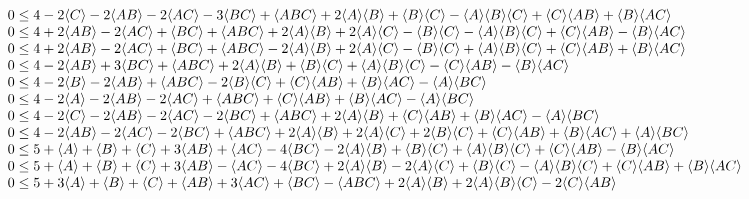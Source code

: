 \begin{align*}
\begin{array}{l}
 0
\leq
{4 -2 \expec{C} -2 \expec{A B} -2 \expec{A C} -3 \expec{B C} + \expec{A B C} + 2 \expec{A} \expec{B} + \expec{B} \expec{C} -\expec{A} \expec{B} \expec{C} + \expec{C} \expec{A B} + \expec{B} \expec{A C}} \\
 0
\leq
{4 + 2 \expec{A B} -2 \expec{A C} + \expec{B C} + \expec{A B C} + 2 \expec{A} \expec{B} + 2 \expec{A} \expec{C} -\expec{B} \expec{C} -\expec{A} \expec{B} \expec{C} + \expec{C} \expec{A B} -\expec{B} \expec{A
   C}} \\
 0
\leq
{4 + 2 \expec{A B} -2 \expec{A C} + \expec{B C} + \expec{A B C} -2 \expec{A} \expec{B} + 2 \expec{A} \expec{C} -\expec{B} \expec{C} + \expec{A} \expec{B} \expec{C} + \expec{C} \expec{A B} + \expec{B} \expec{A C}}
   \\
 0
\leq
{4 -2 \expec{A B} + 3 \expec{B C} + \expec{A B C} + 2 \expec{A} \expec{B} + \expec{B} \expec{C} + \expec{A} \expec{B} \expec{C} -\expec{C} \expec{A B} -\expec{B} \expec{A C}} \\
 0
\leq
{4 -2 \expec{B} -2 \expec{A B} + \expec{A B C} -2 \expec{B} \expec{C} + \expec{C} \expec{A B} + \expec{B} \expec{A C} -\expec{A} \expec{B C}} \\
 0
\leq
{4 -2 \expec{A} -2 \expec{A B} -2 \expec{A C} + \expec{A B C} + \expec{C} \expec{A B} + \expec{B} \expec{A C} -\expec{A} \expec{B C}} \\
 0
\leq
{4 -2 \expec{C} -2 \expec{A B} -2 \expec{A C} -2 \expec{B C} + \expec{A B C} + 2 \expec{A} \expec{B} + \expec{C} \expec{A B} + \expec{B} \expec{A C} -\expec{A} \expec{B C}} \\
 0
\leq
{4 -2 \expec{A B} -2 \expec{A C} -2 \expec{B C} + \expec{A B C} + 2 \expec{A} \expec{B} + 2 \expec{A} \expec{C} + 2 \expec{B} \expec{C} + \expec{C} \expec{A B} + \expec{B} \expec{A C} + \expec{A} \expec{B C}} \\
 0
\leq
{5 + \expec{A} + \expec{B} + \expec{C} + 3 \expec{A B} + \expec{A C} -4 \expec{B C} -2 \expec{A} \expec{B} + \expec{B} \expec{C} + \expec{A} \expec{B} \expec{C} + \expec{C} \expec{A B} -\expec{B} \expec{A C}} \\
 0
\leq
{5 + \expec{A} + \expec{B} + \expec{C} + 3 \expec{A B} -\expec{A C} -4 \expec{B C} + 2 \expec{A} \expec{B} -2 \expec{A} \expec{C} + \expec{B} \expec{C} -\expec{A} \expec{B} \expec{C} + \expec{C} \expec{A B} +
   \expec{B} \expec{A C}} \\
 0
\leq
{5 + 3 \expec{A} + \expec{B} + \expec{C} + \expec{A B} + 3 \expec{A C} + \expec{B C} -\expec{A B C} + 2 \expec{A} \expec{B} + 2 \expec{A} \expec{B} \expec{C} -2 \expec{C} \expec{A B}} \\

\end{array}
\end{align*}
